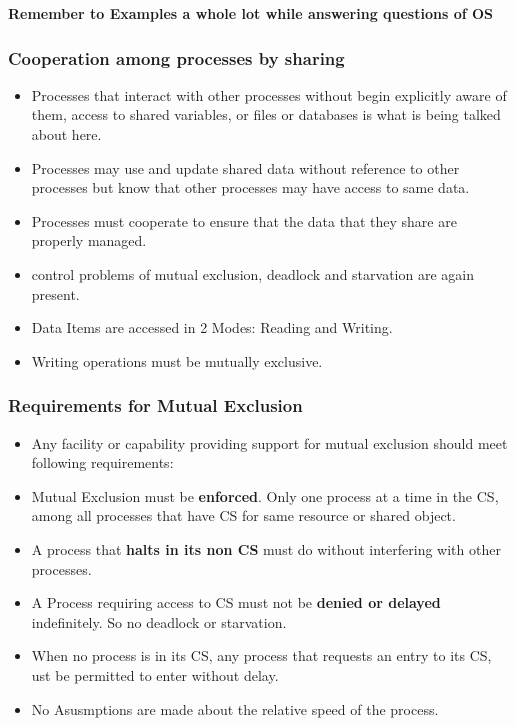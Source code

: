 \documentclass[11pt]{article}
\begin{document}
\textbf{Remember to Examples a whole lot while answering questions of OS}

\subsubsection{Cooperation among processes by sharing}
\begin{itemize}
	\item Processes that interact with other processes without begin explicitly aware of them, access to shared variables, or files or databases is what is being talked about here.
	\item Processes may use and update shared data without reference to other processes but know that other processes may have access to same data.
	\item Processes must cooperate to ensure that the data that they share are properly managed.
	\item control problems of mutual exclusion, deadlock and starvation are again present.
	\item Data Items are accessed in 2 Modes: Reading and Writing.
	\item Writing operations must be mutually exclusive.
\end{itemize}


\subsubsection{Requirements for Mutual Exclusion}
\begin{itemize}
	\item Any facility or capability providing support for mutual exclusion should meet following requirements:
	\item Mutual Exclusion must be \textbf{enforced}. Only one process at a time in the CS, among all processes that have CS for same resource or shared object.
	\item A process that \textbf{halts in its non CS} must do without interfering with other processes.
	\item A Process requiring access to CS must not be \textbf{denied or delayed } indefinitely. So no deadlock or starvation.
	\item When no process is in its CS, any process that requests an entry to its CS, ust be permitted to enter without delay.
	\item No Asusmptions are made about the relative speed of the process.
\end{itemize}
\end{document}
